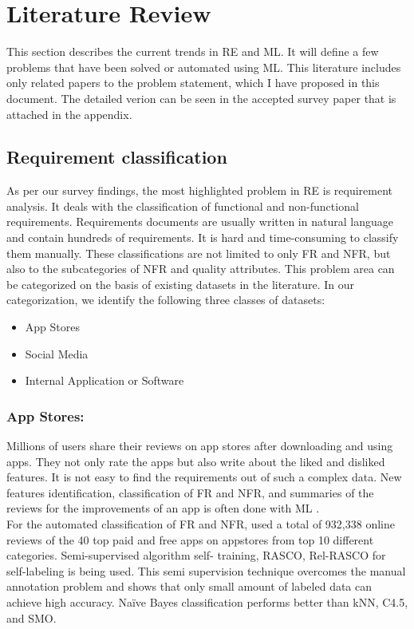 \section{Literature Review}
This section describes the current trends in RE and ML. It will define a few problems that have
been solved or automated using ML. This literature includes only related papers to the problem statement, which I have proposed in this
document. The detailed verion can be seen in the accepted survey paper that is attached in the appendix. 
\subsection{Requirement classification}
As per our survey \cite{tahira} findings, the most highlighted problem in RE
is requirement analysis. It deals with the classification of functional and non-functional
requirements. Requirements documents are usually written in natural language and
contain hundreds of requirements. It is hard and time-consuming to classify them manually.
These classifications are not limited to only FR and NFR, but also to the subcategories of NFR
and quality attributes. This problem area can be categorized on the basis of existing datasets in
the literature. In our categorization, we identify the following three classes of datasets:
\begin{itemize}
\item{App Stores}
\item{Social Media}
\item{Internal Application or Software}
\end{itemize}
\subsubsection{App Stores: }
Millions of users share their reviews on app stores after downloading and using apps. They not only rate the apps but also write about the liked and disliked features. It is not easy to
find the requirements out of such a complex data. New features identification, classification of
FR and NFR, and summaries of the reviews for the improvements of an app is often done with ML
\cite{deocadez2017} \cite{lu2017automatic} \cite{maalej2015bug} \cite{jiang2014}. \\

	For the automated classification of FR and NFR, \cite{deocadez2017}  used a total of 932,338 online
reviews of the 40 top paid and free apps on appstores from top 10 different categories. Semi-supervised algorithm self- training, RASCO, Rel-RASCO for self-labeling is being used. This
semi supervision technique overcomes the manual annotation problem and shows that only
small amount of labeled data can achieve high accuracy. Naïve Bayes classification performs better than kNN, C4.5, and SMO.\\

